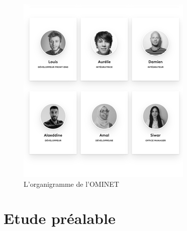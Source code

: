 \begin{figure}[H]
\begin{minipage}{0.45\textwidth}
    \includegraphics[width=\linewidth]{projet/images/diagramme de sequance/images/omminet1.png}
  \end{minipage}
  \caption{L’organigramme de l’OMINET}
\end{figure}
\section{Etude préalable }
